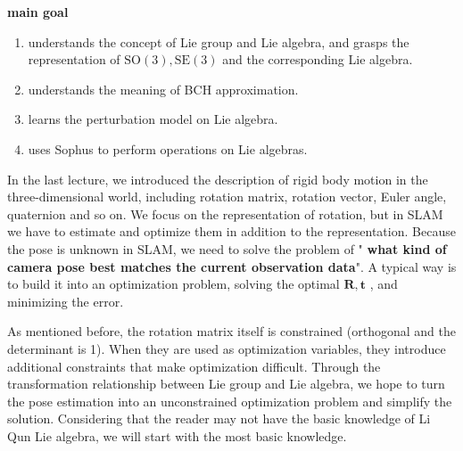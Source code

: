 \begin{mdframed}
	\textbf{ main goal }
	\begin{enumerate}
		\item understands the concept of Lie group and Lie algebra, and grasps the representation of $ \mathrm{SO}( 3 ), \mathrm{SE}( 3 ) $ and the corresponding Lie algebra.
		\item understands the meaning of BCH approximation.
		\item learns the perturbation model on Lie algebra.
		\item uses Sophus to perform operations on Lie algebras.
	\end{enumerate}
\end{mdframed}

In the last lecture, we introduced the description of rigid body motion in the three-dimensional world, including rotation matrix, rotation vector, Euler angle, quaternion and so on. We focus on the representation of rotation, but in SLAM we have to estimate and optimize them in addition to the representation. Because the pose is unknown in SLAM, we need to solve the problem of " \textbf {what kind of camera pose best matches the current observation data}". A typical way is to build it into an optimization problem, solving the optimal $ \bm{R}, \bm{t} $ , and minimizing the error.

As mentioned before, the rotation matrix itself is constrained (orthogonal and the determinant is 1). When they are used as optimization variables, they introduce additional constraints that make optimization difficult. Through the transformation relationship between Lie group and Lie algebra, we hope to turn the pose estimation into an unconstrained optimization problem and simplify the solution. Considering that the reader may not have the basic knowledge of Li Qun Lie algebra, we will start with the most basic knowledge.

\newpage

